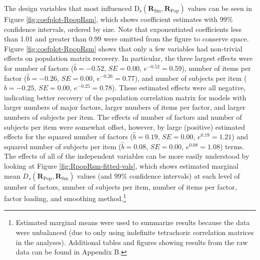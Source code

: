 \documentclass[
  english,
  man]{apa6}
\begin{document}
The design variables that most influenced \(\mathrm{D}_{\mathrm{s}}(\mathbf{R}_{\textrm{Sm}}, \mathbf{R}_{\textrm{Pop}})\) values can be seen in Figure \ref{fig:coefplot-RpopRsm}, which shows coefficient estimates with 99\% confidence intervals, ordered by size. Note that exponentiated coefficients less than 1.01 and greater than 0.99 were omitted from the figure to conserve space. Figure \ref{fig:coefplot-RpopRsm} shows that only a few variables had non-trivial effects on population matrix recovery. In particular, the three largest effects were for number of factors (\(\hat{b} = -0.52\), \(SE = 0.00\), \(e^{-0.52} = 0.59\)), number of items per factor (\(\hat{b} = -0.26\), \(SE = 0.00\), \(e^{-0.26} = 0.77\)), and number of subjects per item (\(\hat{b} = -0.25\), \(SE = 0.00\), \(e^{-0.25} = 0.78\)). These estimated effects were all negative, indicating better recovery of the population correlation matrix for models with larger numbers of major factors, larger numbers of items per factor, and larger numbers of subjects per item. The effects of number of factors and number of subjects per item were somewhat offset, however, by large (positive) estimated effects for the squared number of factors (\(\hat{b} = 0.19\), \(SE = 0.00\), \(e^{0.19} = 1.21\)) and squared number of subjects per item (\(\hat{b} = 0.08\), \(SE = 0.00\), \(e^{0.08} = 1.08\)) terms. The effects of all of the independent variables can be more easily understood by looking at Figure \ref{fig:RpopRsm-fitted-vals}, which shows estimated marginal mean \(D_s(\mathbf{R}_{\textrm{Pop}},\mathbf{R}_{\textrm{Sm}})\) values (and 99\% confidence intervals) at each level of number of factors, number of subjects per item, number of items per factor, factor loading, and smoothing method.\footnote{Estimated marginal means were used to summarize results because the data were unbalanced (due to only using indefinite tetrachoric correlation matrices in the analyses). Additional tables and figures showing results from the raw data can be found in Appendix B.}
\end{document}
